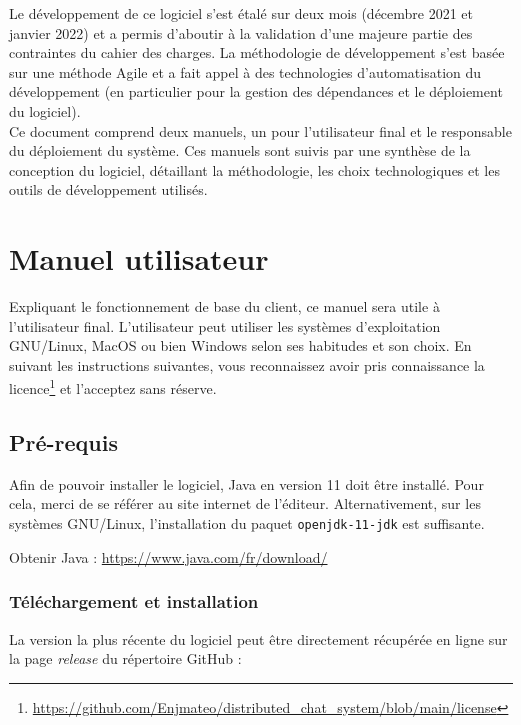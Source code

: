 \documentclass[12pt, a4paper]{article}
\begin{document}
    Le développement de ce logiciel s'est étalé sur deux mois (décembre 2021 et janvier 2022) et a permis d'aboutir à la validation d'une majeure partie des contraintes du cahier des charges.  La méthodologie de développement s'est basée sur une méthode Agile et a fait appel à des technologies d'automatisation du développement (en particulier pour la gestion des dépendances et le déploiement du logiciel).\\ 
    
    Ce document comprend deux manuels, un pour l'utilisateur final et le responsable du déploiement du système. Ces manuels sont suivis par une synthèse de la conception du logiciel, détaillant la méthodologie, les choix technologiques et les outils de développement utilisés.
    
    
    \newpage
    \section{Manuel utilisateur}
    Expliquant le fonctionnement de base du client, ce manuel sera utile à l'utilisateur final. L'utilisateur peut utiliser les systèmes d'exploitation GNU/Linux, MacOS ou bien Windows selon ses habitudes et son choix. En suivant les instructions suivantes, vous reconnaissez avoir pris connaissance la licence\footnote{\url{https://github.com/Enjmateo/distributed_chat_system/blob/main/license}} et l'acceptez sans réserve.
    
    \subsection{Pré-requis}
    Afin de pouvoir installer le logiciel, Java en version 11 doit être installé. Pour cela, merci de se référer au site internet de l'éditeur. Alternativement, sur les systèmes GNU/Linux, l'installation du paquet \texttt{openjdk-11-jdk} est suffisante.
    
    \begin{center}
        Obtenir Java : \url{https://www.java.com/fr/download/}
    \end{center}
    
    \subsubsection{Téléchargement et installation}
    \label{install}
    La version la plus récente du logiciel peut être directement récupérée en ligne sur la page \textit{release} du répertoire GitHub :
    
\end{document}
